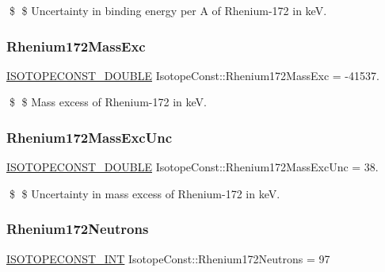 \$ \$ Uncertainty in binding energy per A of Rhenium-\/172 in keV. \mbox{\label{group___isotope_const-_rhenium-_re172_ga36716a9cc8ba34f2977f0694c99c7227}} 
\subsubsection{\texorpdfstring{Rhenium172\+Mass\+Exc}{Rhenium172MassExc}}
{\footnotesize\ttfamily \mbox{\hyperlink{group___isotope_const-_macros_ga8f45a7272ce02c0b4c65c44636ed719a}{I\+S\+O\+T\+O\+P\+E\+C\+O\+N\+S\+T\+\_\+\+D\+O\+U\+B\+LE}} Isotope\+Const\+::\+Rhenium172\+Mass\+Exc = -\/41537.}

\$ \$ Mass excess of Rhenium-\/172 in keV. \mbox{\label{group___isotope_const-_rhenium-_re172_gaf7bcbe5099014206576c891145aa8ef7}} 
\subsubsection{\texorpdfstring{Rhenium172\+Mass\+Exc\+Unc}{Rhenium172MassExcUnc}}
{\footnotesize\ttfamily \mbox{\hyperlink{group___isotope_const-_macros_ga8f45a7272ce02c0b4c65c44636ed719a}{I\+S\+O\+T\+O\+P\+E\+C\+O\+N\+S\+T\+\_\+\+D\+O\+U\+B\+LE}} Isotope\+Const\+::\+Rhenium172\+Mass\+Exc\+Unc = 38.}

\$ \$ Uncertainty in mass excess of Rhenium-\/172 in keV. \mbox{\label{group___isotope_const-_rhenium-_re172_ga698e547ec5a21b47edbe4be39ba39aff}} 
\subsubsection{\texorpdfstring{Rhenium172\+Neutrons}{Rhenium172Neutrons}}
{\footnotesize\ttfamily \mbox{\hyperlink{group___isotope_const-_macros_ga5f18360b3e99483a35c32d789e62621c}{I\+S\+O\+T\+O\+P\+E\+C\+O\+N\+S\+T\+\_\+\+I\+NT}} Isotope\+Const\+::\+Rhenium172\+Neutrons = 97}

